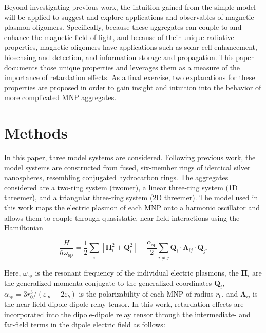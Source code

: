 \documentclass[12pt, letterpaper, twoside]{report}
\begin{document}
Beyond investigating previous work, the intuition gained from the simple model will be applied to suggest and explore applications and observables of magnetic plasmon oligomers. Specifically, because these aggregates can couple to and enhance the magnetic field of light, and because of their unique radiative properties, magnetic oligomers have applications such as solar cell enhancement\cite{Graydon2011,Alu2014solar,Le2015solar}, biosensing and detection\cite{Zia2010trans,Noginova2008trans,Wang:13,Fan2015,Wei2015,Shvets2012,Altug2012bio,Nord2011fano}, and information storage and propagation\cite{Zhang2006,NordHal2011,NordHal2012}. This paper documents those unique properties and leverages them as a measure of the importance of retardation effects. As a final exercise, two explanations for these properties are proposed in order to gain insight and intuition into the behavior of more complicated MNP aggregates.

\section*{Methods}
In this paper, three model systems are considered. Following previous work\cite{Cherqui2014,Weick2013,Engheta2017}, the model systems are constructed from fused, six-member rings of identical silver nanospheres, resembling conjugated hydrocarbon rings. The aggregates considered are a two-ring system (twomer), a linear three-ring system (1D threemer), and a triangular three-ring system (2D threemer). The model used in this work maps the electric plasmon of each MNP onto a harmonic oscillator and allows them to couple through quasistatic, near-field interactions using the Hamiltonian\cite{Cherqui2014}

\begin{equation}
\frac{H}{\hbar\omega_{\textrm{sp}}} = \frac{1}{2}\sum_{i}\left[\boldsymbol{\Pi}_{i}^2 + \textbf{Q}_{i}^{2}\right] - \frac{\alpha_{\textrm{sp}}}{2}\sum_{i\neq j}\textbf{Q}_{i}\cdot\boldsymbol{\Lambda}_{ij}\cdot\textbf{Q}_{j}.
\label{full_hammy}
\end{equation}

\noindent Here, $\omega_{\textrm{sp}}$ is the resonant frequency of the individual electric plasmons, the $\boldsymbol{\Pi}_{i}$ are the generalized momenta conjugate to the generalized coordinates $\textbf{Q}_{i}$, $\alpha_{\textrm{sp}} = 3r_0^3/(\varepsilon_{\infty}+2\varepsilon_b)$ is the polarizability of each MNP of radius $r_0$, and $\boldsymbol{\Lambda}_{ij}$ is the near-field dipole-dipole relay tensor. In this work, retardation effects are incorporated into the dipole-dipole relay tensor through the intermediate- and far-field terms in the dipole electric field as follows:
\end{document}
